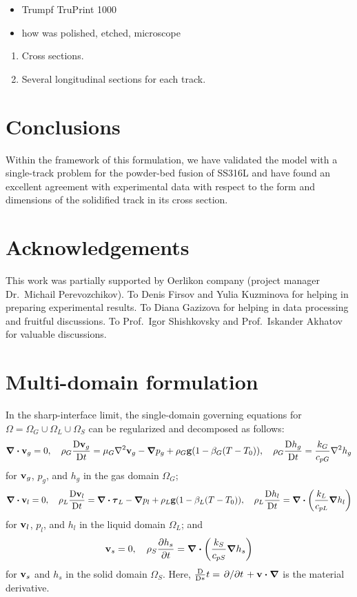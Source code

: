 \documentclass{article}
\newcommand\Dv[2][]{\frac{\mathrm{D}#1}{\mathrm{D}#2}}
\newcommand{\bv}{\vb{v}}
\newcommand{\btau}{\vb*\tau}
\begin{document}
\begin{itemize}
    \item Trumpf TruPrint 1000
    \item how was polished, etched, microscope
\end{itemize}


\begin{enumerate}
    \item Cross sections.
    \item Several longitudinal sections for each track.
\end{enumerate}

\section{Conclusions}

Within the framework of this formulation, we have validated the model with a single-track problem
for the powder-bed fusion of SS316L and have found an excellent agreement with experimental data
with respect to the form and dimensions of the solidified track in its cross section.

\section{Acknowledgements}
This work was partially supported by Oerlikon company (project manager Dr.~Michail Perevozchikov).
To Denis Firsov and Yulia Kuzminova for helping in preparing experimental results.
To Diana Gazizova for helping in data processing and fruitful discussions.
To Prof.~Igor Shishkovsky and Prof.~Iskander Akhatov for valuable discussions.

\appendix

\section{Multi-domain formulation}

In the sharp-interface limit, the single-domain governing equations for $\Omega=\Omega_G\cup\Omega_L\cup\Omega_S$ can be regularized and decomposed as follows: 
\begin{equation}
    \div\bv_g = 0, \quad
    \rho_G\Dv[\bv_g]{t} = \mu_G\laplacian\bv_g - \grad{p_g} + \rho_G\vb{g}(1-\beta_G(T-T_0)), \quad
    \rho_G\Dv[h_g]{t} = \frac{k_G}{c_{pG}}\laplacian{h_g} 
\end{equation}
for $\bv_g$, $p_g$, and $h_g$ in the gas domain $\Omega_G$;
\begin{equation}
    \div\bv_l = 0, \quad
    \rho_L\Dv[\bv_l]{t} = \div\btau_L - \grad{p_l} + \rho_L\vb{g}(1-\beta_L(T-T_0)), \quad
    \rho_L\Dv[h_l]{t} = \div(\frac{k_L}{c_{pL}}\grad{h_l})
\end{equation}
for $\bv_l$, $p_l$, and $h_l$ in the liquid domain $\Omega_L$; and
\begin{equation}
    \bv_s = 0, \quad \rho_S\pdv{h_s}{t} = \div(\frac{k_S}{c_{pS}}\grad{h_s})
\end{equation}
for $\bv_s$ and $h_s$ in the solid domain $\Omega_S$.
Here, $\Dv*{t} = \pdv*{t} + \bv\vdot\grad$ is the material derivative.
\end{document}
